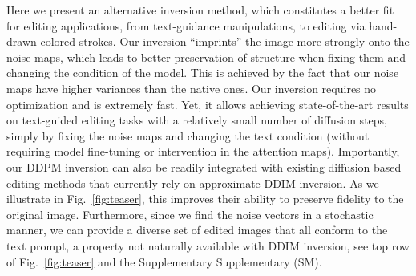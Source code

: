 Here we present an alternative inversion method, which constitutes a better fit for editing applications, from text-guidance manipulations, to editing via hand-drawn colored strokes. Our inversion ``imprints'' the image more strongly onto the noise maps, which leads to better preservation of structure when fixing them and changing the condition of the model.
This is achieved by the fact that our noise maps have higher variances than the native ones. %
Our inversion requires no optimization and is extremely fast. Yet, it allows achieving state-of-the-art results on text-guided editing tasks with a relatively small number of diffusion steps, simply by fixing the noise maps and changing the text condition (\ie without requiring model fine-tuning or intervention in the attention maps). Importantly, our DDPM inversion can also be readily integrated with existing diffusion based editing methods that currently rely on approximate DDIM inversion. As we illustrate in Fig.~\ref{fig:teaser}, this improves their ability to preserve fidelity to the original image. Furthermore, since we find the noise vectors in a stochastic manner, we can provide a diverse set of edited images that all conform to the text prompt, a property not naturally available with DDIM inversion, see top row of Fig.~\ref{fig:teaser} and the Supplementary Supplementary (SM).%






 

